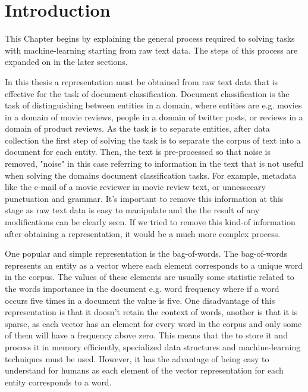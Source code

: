 
\section{Introduction}

This Chapter begins by explaining the general process required to solving tasks with machine-learning starting from raw text data. The steps of this process are expanded on in the later sections.

In this thesis a representation must be obtained from raw text data that is effective for the task of document classification. Document classification is the task of distinguishing between entities in a domain, where entities are e.g. movies in a domain of movie reviews, people in a domain of twitter posts, or reviews in a domain of product reviews. As the task is to separate entities, after data collection the first step of solving the task is to separate the corpus of text into a document for each entity. Then, the text is pre-processed so that noise is removed, "noise" in this case referring to information in the text that is not useful when solving the domains document classification tasks. For example, metadata like the e-mail of a movie reviewer in movie review text, or unnessecary punctuation and grammar. It's important to remove this information at this stage as raw text data is easy to manipulate and the the result of any modifications can be clearly seen. If we tried to remove this kind-of information after obtaining a representation, it would be a much more complex process.

One popular and simple representation is the bag-of-words. The bag-of-words  represents an entity as a vector where each element corresponds to a unique word in the corpus. The values of these elements are usually some statistic related to the words importance in the document e.g. word frequency where if a word occurs five times in a document the value is five. One disadvantage of this representation is that it doesn't retain the context of words, another is that it is sparse, as each vector has an element for every word in the corpus and only some of them will have a frequency above zero. This means that the to store it and process it in memory efficiently, specialized data structures and machine-learning techniques must be used. However, it has the advantage of being easy to understand for humans as each element of the vector representation for each entity corresponds to a word. 

